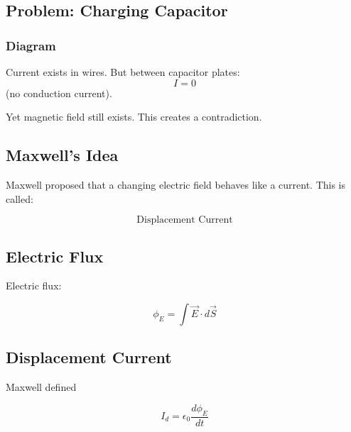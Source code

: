 \documentclass[11pt,a4paper]{article}
\begin{document}
\subsection*{Problem: Charging Capacitor}
\subsubsection*{Diagram}
\begin{center}
\end{center}

Current exists in wires.
But between capacitor plates:
\[ I = 0 \]
(no conduction current).

Yet magnetic field still exists. This creates a contradiction.

\subsection*{Maxwell's Idea}
Maxwell proposed that a changing electric field behaves like a current.
This is called:
\begin{tcolorbox}[colback=RoyalBlue!5!white, colframe=RoyalBlue]
    \[ \text{Displacement Current} \]
\end{tcolorbox}

\subsection*{Electric Flux}
Electric flux:
\begin{tcolorbox}[colback=RoyalBlue!5!white, colframe=RoyalBlue]
    \[ \phi_E = \int \vec{E} \cdot d\vec{S} \]
\end{tcolorbox}

\subsection*{Displacement Current}
Maxwell defined
\begin{tcolorbox}[colback=RoyalBlue!5!white, colframe=RoyalBlue]
    \[ I_d = \epsilon_0 \frac{d\phi_E}{dt} \]
\end{tcolorbox}
\end{document}
